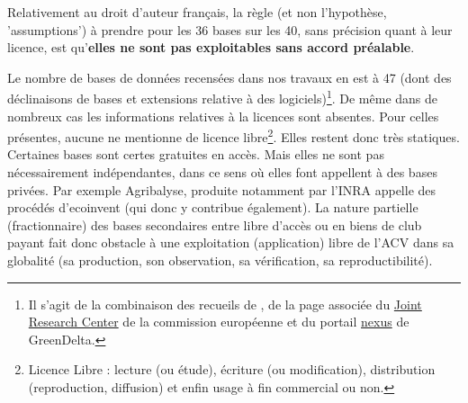 Relativement au droit d'auteur français, la règle (et non l'hypothèse, 'assumptions') à prendre pour les 36 bases sur les 40, sans précision quant à leur licence, est qu'\textbf{elles ne sont pas exploitables sans accord préalable}.

Le nombre de bases de données recensées dans nos travaux en est à 47 (dont des déclinaisons de bases et extensions relative à des logiciels)\footnote{Il s'agit de la combinaison des recueils de \citeauthor{sayan_contribution_2011}, de la page associée du \href{http://eplca.jrc.ec.europa.eu/ResourceDirectory/faces/databases/databaseList.xhtml}{Joint Research Center} de la commission européenne et du portail \href{http://nexus.openlca.org/}{nexus} de GreenDelta.}.
De même dans de nombreux cas les informations relatives à la licences sont absentes.
Pour celles présentes, aucune ne mentionne de licence libre\footnote{Licence Libre : lecture (ou étude), écriture (ou modification), distribution (reproduction, diffusion) et enfin usage à fin commercial ou non.}.
Elles restent donc très statiques.
Certaines bases sont certes gratuites en accès.
Mais elles ne sont pas nécessairement indépendantes, dans ce sens où elles font appellent à des bases privées.
Par exemple Agribalyse, produite notamment par l'INRA appelle des procédés d'ecoinvent (qui donc y contribue également).
La nature partielle (fractionnaire) des bases secondaires entre libre d'accès ou en biens de club payant fait donc obstacle à une exploitation (application) libre de l'\gls{ACV} dans sa globalité (sa production, son observation, sa vérification, sa reproductibilité).

